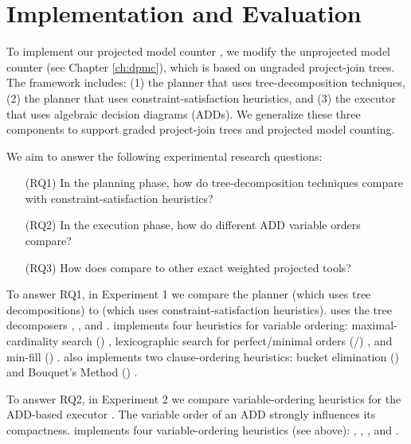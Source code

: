 \section{Implementation and Evaluation}
\label{sec:procount:experiments}

To implement our projected model counter \procount, we modify the unprojected model counter \dpmc{} (see Chapter \ref{ch:dpmc}), which is based on ungraded project-join trees.
The \dpmc{} framework includes: 
(1) the \Lg{} planner that uses tree-decomposition techniques, 
(2) the \htb{} planner that uses constraint-satisfaction heuristics, and
(3) the \dmc{} executor that uses algebraic decision diagrams (ADDs).
We generalize these three components to support graded project-join trees and projected model counting.

We aim to answer the following experimental research questions:
\begin{enumerate}
    \item[(RQ1)] In the planning phase, how do tree-decomposition techniques compare with constraint-satisfaction heuristics?
    \item[(RQ2)] In the execution phase, how do different ADD variable orders compare?
    \item[(RQ3)] How does \procount{} compare to other exact weighted projected tools?
\end{enumerate}

To answer RQ1, in Experiment 1 we compare the planner \Lg{} (which uses tree decompositions) to \htb{} (which uses constraint-satisfaction heuristics).
\Lg{} uses the tree decomposers \flowcutter{} \cite{strasser2017computing}, \htd{} \cite{AMW17}, and \tamaki{} \cite{Tamaki17}.
\htb{} implements four heuristics for variable ordering: maximal-cardinality search (\mcs{}) \cite{tarjan1984simple}, lexicographic search for perfect/minimal orders (\lexp/\lexm{}) \cite{koster2001treewidth}, and min-fill (\minfill{}) \cite{dechter03}.
\htb{} also implements two clause-ordering heuristics: bucket elimination (\be) \cite{dechter99} and Bouquet's Method (\bm) \cite{bouquet1999gestion}%
.

To answer RQ2, in Experiment 2 we compare variable-ordering heuristics for the ADD-based executor \dmc.
The variable order of an ADD strongly influences its compactness.
\dmc{} implements four variable-ordering heuristics (see above): \mcs, \lexp, \lexm, and \minfill{}.

